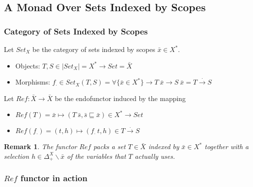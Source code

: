 \documentclass[aspectratio=169]{beamer}
\theoremstyle{remarkstyle}
\newtheorem*{remark}{Remark}
\begin{document}
\subsection{A Monad Over Sets Indexed by Scopes}

\begin{frame}[fragile]
  \frametitle{Category of Sets Indexed by Scopes}
  \begin{definition}
    Let $Set_X$ be the category of sets indexed by scopes $\bar{x} ∈ X^*$.
    \begin{itemize}
      \item Objects: $T, S ∈ |Set_X| = X^* → Set = \bar{X}$
      \item Morphisms: $f_⋅ ∈ Set_X(T, S) = ∀ \{\bar{x}∈X^*\} → T \ \bar{x} → S \ \bar{x} = T \stackrel{⋅}{→} S$
    \end{itemize}
  \end{definition}
  \begin{definition}
    Let $Ref : \bar{X} → \bar{X}$ be the endofunctor induced by the mapping
    \begin{itemize}
      \item $Ref(T) = \bar{x} ↦ (T \ \bar{s} , \bar{s} ⊑ \bar{x}) ∈ X^* → Set$
      \item{$Ref(f_⋅) = (t, h) ↦ (f_⋅ \ t , h) ∈ T \stackrel{⋅}{→} S$}
    \end{itemize}
  \end{definition}
  \begin{remark}
    The functor $Ref$ packs a set $T ∈ \bar{X}$ indexed by $\bar{x} ∈ X^*$ together with a selection $h ∈ Δ_+^X∖\bar{x}$ of the variables that $T$ actually uses.
  \end{remark}
\end{frame}


\begin{frame}[fragile]
  \frametitle{$Ref$ functor in action}
  \begin{example}
  \end{example}
\end{frame}
\end{document}

